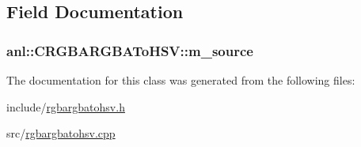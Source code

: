 \subsection{Field Documentation}
\hypertarget{classanl_1_1CRGBARGBAToHSV_aed0d98a346ea73e2f53d74f7491d6820}{
\subsubsection[{m\_\-source}]{ {\bf anl::CRGBARGBAToHSV::m\_\-source}}}
\label{classanl_1_1CRGBARGBAToHSV_aed0d98a346ea73e2f53d74f7491d6820}


The documentation for this class was generated from the following files:\begin{DoxyCompactItemize}
\item 
include/\hyperlink{rgbargbatohsv_8h}{rgbargbatohsv.h}\item 
src/\hyperlink{rgbargbatohsv_8cpp}{rgbargbatohsv.cpp}\end{DoxyCompactItemize}
